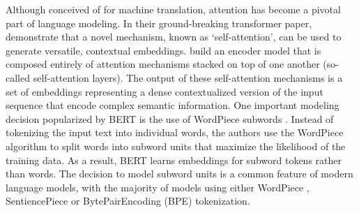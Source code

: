 Although conceived of for machine translation, attention has become a pivotal part of language modeling. In their ground-breaking transformer paper, \cite{vaswani2017attention} demonstrate that a novel mechanism, known as `self-attention', can be used to generate versatile, contextual embeddings. \cite{vaswani2017attention} build an encoder model that is composed entirely of attention mechanisms stacked on top of one another (so-called self-attention layers).
The output of these self-attention mechanisms is a set of embeddings representing a dense contextualized version of the input sequence that encode complex semantic information. One important modeling decision popularized by BERT is the use of WordPiece subwords \citep{wu2016google}. Instead of tokenizing the input text into individual words, the authors use the WordPiece algorithm to split words into subword units that maximize the likelihood of the training data. As a result, BERT learns embeddings for subword tokens rather than words. The decision to model subword units is a common feature of modern language models, with the majority of models using either WordPiece \citep{wu2016google}, SentiencePiece \citep{kudo-2018-subword} or BytePairEncoding (BPE) \citep{sennrich2015neural} tokenization. %

% 